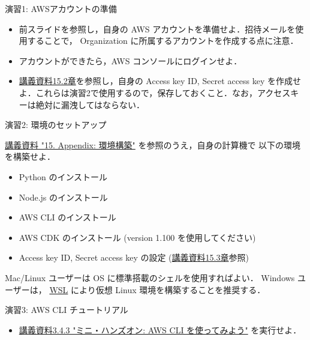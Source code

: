 \documentclass[unicode,11pt]{beamer}
\begin{document}
\begin{frame}{演習1: AWSアカウントの準備}
\begin{itemize}
    \item 前スライドを参照し，自身の AWS アカウントを準備せよ．招待メールを使用することで， Organization に所属するアカウントを作成する点に注意．
    \item アカウントができたら，AWS コンソールにログインせよ．
    \item \href{https://tomomano.github.io/learn-aws-by-coding/#aws_secrets}{講義資料15.2章}を参照し，自身の Access key ID, Secret access key を作成せよ．これらは演習2で使用するので，保存しておくこと．なお，アクセスキーは絶対に漏洩してはならない．
\end{itemize}
\end{frame}

\begin{frame}{演習2: 環境のセットアップ}

\href{https://tomomano.github.io/learn-aws-by-coding/#sec:appendix_settingup}{講義資料 "15. Appendix: 環境構築"} を参照のうえ，自身の計算機で
以下の環境を構築せよ．

\begin{itemize}
    \item Python のインストール
    \item Node.js のインストール
    \item AWS CLI のインストール
    \item AWS CDK のインストール (version 1.100 を使用してください)
    \item Access key ID, Secret access key の設定 (\href{https://tomomano.github.io/learn-aws-by-coding/#aws_secrets}{講義資料15.3章}参照)
\end{itemize}

Mac/Linux ユーザーは OS に標準搭載のシェルを使用すればよい．
Windows ユーザーは， \href{https://docs.microsoft.com/en-us/windows/wsl/install}{WSL} により仮想 Linux 環境を構築することを推奨する．

\end{frame}

\begin{frame}{演習3: AWS CLI チュートリアル}

\begin{itemize}
    \item \href{https://tomomano.github.io/learn-aws-by-coding/\#\_aws\%E3\%81\%A7\%E3\%81\%AE\%E3\%82\%AF\%E3\%83\%A9\%E3\%82\%A6\%E3\%83\%89\%E9\%96\%8B\%E7\%99\%BA}{講義資料3.4.3 "ミニ・ハンズオン: AWS CLI を使ってみよう"} を実行せよ．
\end{itemize}
    
\end{frame}
\end{document}

